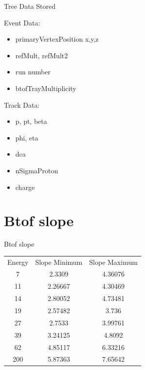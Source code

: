 \documentclass{beamer}
\begin{document}
\begin{frame}{Tree Data Stored}

Event Data:
\begin{itemize}
    \item primaryVertexPosition x,y,z
    \item refMult, refMult2
    \item run number
    \item btofTrayMultiplicity
\end{itemize}
\vspace{1cm}
Track Data:
\begin{itemize}
    \item p, pt, beta
    \item phi, eta
    \item dca
    \item nSigmaProton
    \item charge
\end{itemize}
    
\end{frame}

\section{Btof slope}

\begin{frame}{Btof slope}

\begin{center}
    \begin{tabular}{ c c c }
    Energy & Slope Minimum & Slope Maximum \\
    7 & 2.3309 & 4.36076 \\
    11 & 2.26667 & 4.30469 \\
    14 & 2.80052 & 4.73481 \\
    19 & 2.57482 & 3.736 \\
    27 & 2.7533 & 3.99761 \\
    39 & 3.24125 & 4.8092 \\
    62 & 4.85117 & 6.33216 \\
    200 & 5.87363 & 7.65642
    \end{tabular}
\end{center}
    
\end{frame}
\end{document}
